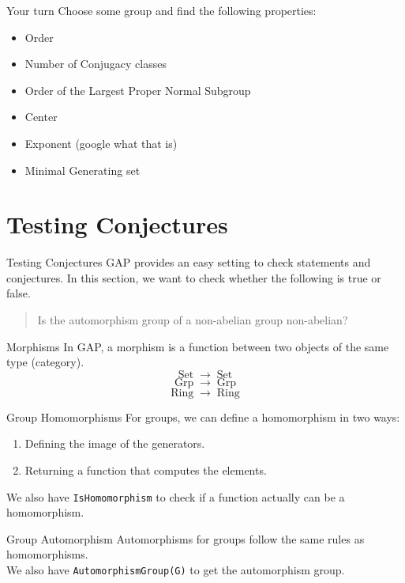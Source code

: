 \documentclass{beamer}
\begin{document}
\begin{frame}[fragile]{Your turn}
    Choose some group and find the following properties:
    \begin{itemize}
        \item Order
        \item Number of Conjugacy classes
        \item Order of the Largest Proper Normal Subgroup
        \item Center
        \item Exponent (google what that is)
        \item Minimal Generating set
    \end{itemize}
\end{frame}
\section{Testing Conjectures}
\begin{frame}{Testing Conjectures}
    GAP provides an easy setting to check statements and conjectures. In this section, we want to check whether the following is true or false.
    \begin{quote}
        Is the automorphism group of a non-abelian group non-abelian?
    \end{quote}
\end{frame}
\begin{frame}{Morphisms}
    In GAP, a morphism is a function between two objects of the same type (category).
    \[\operatorname{Set} \to \operatorname{Set} \]
    \[\operatorname{Grp} \to \operatorname{Grp} \]
    \[\operatorname{Ring} \to \operatorname{Ring} \]
\end{frame}
\begin{frame}[fragile]{Group Homomorphisms}
    For groups, we can define a homomorphism in two ways:
    \begin{enumerate}
        \item Defining the image of the generators.
        \item Returning a function that computes the elements.
    \end{enumerate} \pause
    We also have \verb|IsHomomorphism| to check if a function actually can be a homomorphism.
\end{frame}
\begin{frame}[fragile]{Group Automorphism}
    Automorphisms for groups follow the same rules as homomorphisms. \\\pause
    We also have \verb|AutomorphismGroup(G)| to get the automorphism group.
\end{frame}
\end{document}
